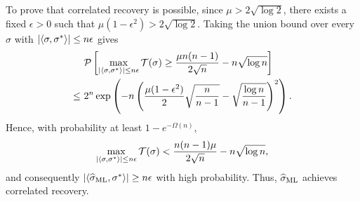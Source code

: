 To prove that correlated recovery is possible, 
since $\mu > 2 \sqrt{\log 2}$, there exists a fixed $\epsilon>0$ such that $\mu (1-\epsilon^2) > 2  
\sqrt{\log 2}$. 
Taking the union bound over every $\sigma$ with $|\Iprod{\sigma}{\sigma^*}| \le n \epsilon$ gives
\begin{align*}
	 &~\P\left[\max_{ |\Iprod{\sigma}{\sigma^*}| \le n \epsilon }\score(\sigma) 
	\ge \frac{\mu n (n-1)  }{2\sqrt n} - n \sqrt{\log n} \right] \\
	\le &~2^n \exp \left( -  n\left( \frac{\mu (1-\epsilon^2) }{2} \sqrt{\frac{n}{n-1}} - 
	\sqrt{\frac{\log n}{n-1} } \right)^2  \right).
\end{align*}
 Hence, with probability at least $1-e^{-\Omega(n)}$, 
$$
\max_{ |\Iprod{\sigma}{\sigma^*}| \le n \epsilon } \score(\sigma)  <  \frac{n (n-1) \mu }{2\sqrt n} - n \sqrt{\log n},
$$
and consequently $ | \Iprod{ \hat{\sigma}_{\rm ML} }{ \sigma^*} |  \ge n \epsilon $ with high probability.
Thus, $ \hat{\sigma}_{\rm ML}$ achieves correlated recovery.



